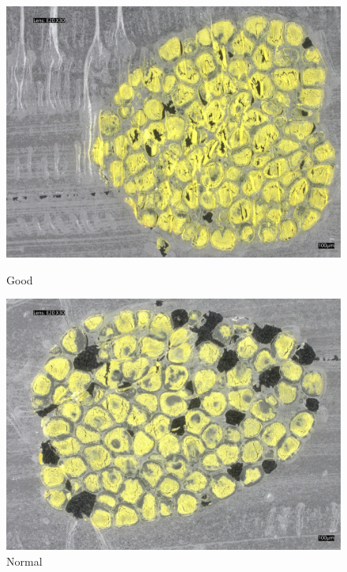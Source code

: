 \begin{figure}[H]
    \centering
    \begin{minipage}{0.24\textwidth}
        \centering
        \includegraphics[width=\textwidth]{./fig/fish_lung/good20240313_144138.jpg}
        \caption*{Good}
    \end{minipage}
    \begin{minipage}{0.24\textwidth}
        \centering
        \includegraphics[width=\textwidth]{./fig/fish_lung/normal20240313_141726.jpg}
        \caption*{Normal}
    \end{minipage}
    \begin{minipage}{0.24\textwidth}

\end{minipage}
\end{figure}
